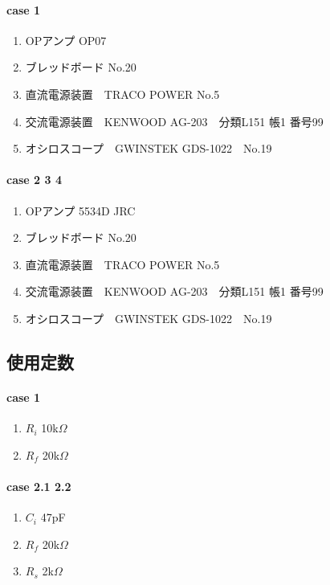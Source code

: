 \documentclass[dvipdfmx,titlepage,a4j]{jsarticle}  %
\begin{document}
\paragraph{case 1}
\begin{enumerate}
  \item OPアンプ OP07
  \item ブレッドボード No.20
  \item 直流電源装置　TRACO POWER No.5
  \item 交流電源装置　KENWOOD AG-203　分類L151 帳1 番号99
  \item オシロスコープ　GWINSTEK GDS-1022　No.19
\end{enumerate}

\paragraph{case 2 3 4}
\begin{enumerate}
  \item OPアンプ 5534D JRC
  \item ブレッドボード No.20
  \item 直流電源装置　TRACO POWER No.5
  \item 交流電源装置　KENWOOD AG-203　分類L151 帳1 番号99
  \item オシロスコープ　GWINSTEK GDS-1022　No.19
\end{enumerate}

\subsection{使用定数}
\paragraph{case 1}
\begin{enumerate}
  \item $R_i$ 10k$\Omega$
  \item $R_f$ 20k$\Omega$
\end{enumerate}

\paragraph{case 2.1 2.2}
\begin{enumerate}
  \item $C_{i}$ 47pF
  \item $R_f$ 20k$\Omega$
  \item $R_s$ 2k$\Omega$
\end{enumerate}
\end{document}
